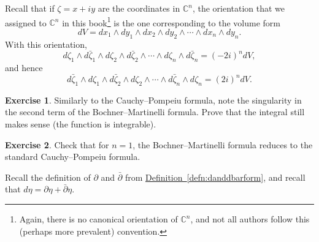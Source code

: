 \documentclass[12pt,openany]{book}
\newcommand{\C}{{\mathbb{C}}}
\theoremstyle{plain}
\theoremstyle{remark}
\theoremstyle{definition}
\newenvironment{exbox}{%
    \def\FrameCommand{\vrule width 1pt \relax\hspace{10pt}}%
    \MakeFramed{\advance\hsize-\width\FrameRestore}%
}{%
    \endMakeFramed
}
\theoremstyle{exercise}
\newtheorem{exercise}{Exercise}[section]
\theoremstyle{example}
\newcommand{\defnref}[1]{\hyperref[#1]{Definition~\ref*{#1}}}
\begin{document}
Recall that if $\zeta = x+iy$ are the coordinates in $\C^n$, the orientation that we assigned to $\C^n$ in
this book\footnote{Again, there is
no canonical orientation of $\C^n$, and
not all authors follow this (perhaps more prevalent) convention.}
is the one corresponding to the volume form
%
\begin{equation*}
dV = dx_1 \wedge dy_1 \wedge dx_2 \wedge dy_2 \wedge \cdots \wedge dx_n \wedge dy_n .
\end{equation*}
With this orientation,
\begin{equation*}
d\zeta_1 \wedge d\bar{\zeta}_1 \wedge
d\zeta_2 \wedge d\bar{\zeta}_2 \wedge
\cdots \wedge
d\zeta_n \wedge d\bar{\zeta}_n = {(-2i)}^n dV ,
\end{equation*}
and hence
\begin{equation*}
d\bar{\zeta}_1 \wedge d\zeta_1 \wedge
d\bar{\zeta}_2 \wedge d\zeta_2 \wedge
\cdots \wedge
d\bar{\zeta}_n \wedge d\zeta_n = {(2i)}^n dV .
\end{equation*}

\begin{exbox}
\begin{exercise}
Similarly to the Cauchy--Pompeiu formula,
note the singularity in the second term of the Bochner--Martinelli formula.
Prove that the integral still makes
sense (the function is integrable).
\end{exercise}

\begin{exercise}
Check that for $n=1$, the Bochner--Martinelli formula
reduces to the standard Cauchy--Pompeiu formula.
\end{exercise}
\end{exbox}

Recall the definition of $\partial$ and $\bar{\partial}$ from
\defnref{defn:danddbarform}, and recall that $d \eta = \partial \eta +
\bar{\partial} \eta$.
\end{document}
